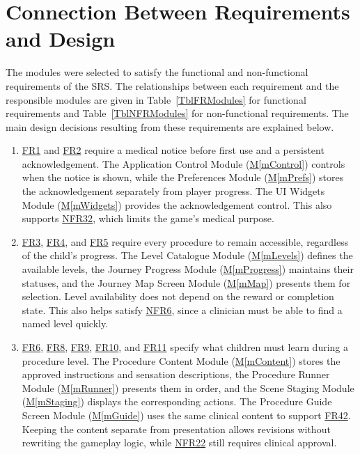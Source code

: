 \documentclass[10pt, titlepage]{article}
\newcommand{\srsurl}{https://team-hindsight.github.io/ophthamology-game/SRS/SRS.pdf}
\newcommand{\srsitemref}[2]{\href{\srsurl\#nameddest=#1}{#2}}
\newcommand{\mref}[1]{\texorpdfstring{\hyperref[md:#1]{M\ref*{#1}}}{M\ref*{#1}}}
\begin{document}
\newpage
\section{Connection Between Requirements and Design} \label{SecConnection}

The modules were selected to satisfy the functional and non-functional requirements
of the SRS. The relationships between each requirement and the responsible modules
are given in Table~\ref{TblFRModules} for functional requirements and
Table~\ref{TblNFRModules} for non-functional requirements. The main design
decisions resulting from these requirements are explained below.

\begin{enumerate}[leftmargin=*, itemsep=0.5em, parsep=0.15em]
\item \srsitemref{FR_MedicalNotice}{FR1} and \srsitemref{FR_RecordAck}{FR2}
  require a medical notice before first use and a persistent acknowledgement.
  The Application Control Module (\mref{mControl}) controls when the notice is
  shown, while the Preferences Module (\mref{mPrefs}) stores the
  acknowledgement separately from player progress. The UI Widgets Module
  (\mref{mWidgets}) provides the acknowledgement control. This also supports
  \srsitemref{NFR_NoClaims}{NFR32}, which limits the game's medical purpose.

\item \srsitemref{FR_JourneyMap}{FR3}, \srsitemref{FR_StartLevel}{FR4}, and
  \srsitemref{FR_Replay}{FR5} require every procedure to remain accessible,
  regardless of the child's progress. The Level Catalogue Module
  (\mref{mLevels}) defines the available levels, the Journey Progress Module
  (\mref{mProgress}) maintains their statuses, and the Journey Map Screen
  Module (\mref{mMap}) presents them for selection. Level availability does not
  depend on the reward or completion state. This also helps satisfy
  \srsitemref{NFR_ClinicianUse}{NFR6}, since a clinician must be able to find
  a named level quickly.

\item \srsitemref{FR_LevelContent}{FR6}, \srsitemref{FR_DescribeSensations}{FR8},
  \srsitemref{FR_TruthfulSensations}{FR9}, \srsitemref{FR_ClinicsDiffer}{FR10},
  and \srsitemref{FR_SpeakUp}{FR11} specify what children must learn during a
  procedure level. The Procedure Content Module (\mref{mContent}) stores the
  approved instructions and sensation descriptions, the Procedure Runner Module
  (\mref{mRunner}) presents them in order, and the Scene Staging Module
  (\mref{mStaging}) displays the corresponding actions. The Procedure Guide
  Screen Module (\mref{mGuide}) uses the same clinical content to support
  \srsitemref{FR_ProcedureGuide}{FR42}. Keeping the content separate from
  presentation allows revisions without rewriting the gameplay logic, while
  \srsitemref{NFR_ClinicalAccuracy}{NFR22} still requires clinical approval.


\end{enumerate}
\end{document}
